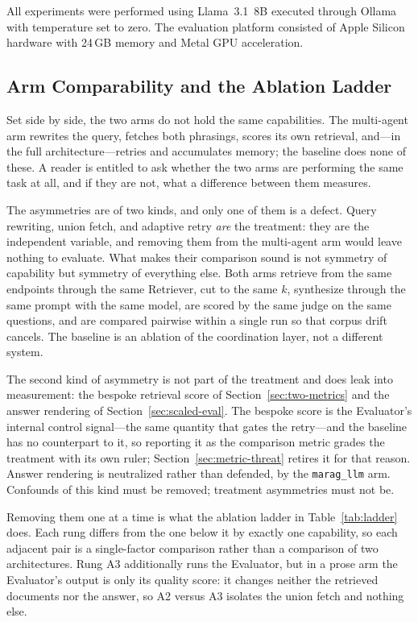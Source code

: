 \documentclass[acmsmall,review,anonymous,screen]{acmart}
\begin{document}
All experiments were performed using Llama~3.1~8B executed through
Ollama with temperature set to zero. The evaluation platform consisted
of Apple Silicon hardware with 24\,GB memory and Metal GPU
acceleration.

\subsection{Arm Comparability and the Ablation Ladder}\label{sec:ladder}

Set side by side, the two arms do not hold the same capabilities. The
multi-agent arm rewrites the query, fetches both phrasings, scores its own
retrieval, and---in the full architecture---retries and accumulates memory; the
baseline does none of these. A reader is entitled to ask whether the two arms
are performing the same task at all, and if they are not, what a difference
between them measures.

The asymmetries are of two kinds, and only one of them is a defect. Query
rewriting, union fetch, and adaptive retry \emph{are} the treatment: they are
the independent variable, and removing them from the multi-agent arm would
leave nothing to evaluate. What makes their comparison sound is not symmetry of
capability but symmetry of everything else. Both arms retrieve from the same
endpoints through the same Retriever, cut to the same $k$, synthesize through
the same prompt with the same model, are scored by the same judge on the same
questions, and are compared pairwise within a single run so that corpus drift
cancels. The baseline is an ablation of the coordination layer, not a different
system.

The second kind of asymmetry is not part of the treatment and does leak into
measurement: the bespoke retrieval score of Section~\ref{sec:two-metrics} and
the answer rendering of Section~\ref{sec:scaled-eval}. The bespoke score is the
Evaluator's internal control signal---the same quantity that gates the
retry---and the baseline has no counterpart to it, so reporting it as the
comparison metric grades the treatment with its own ruler; Section~\ref{sec:metric-threat}
retires it for that reason. Answer rendering is neutralized rather than
defended, by the \texttt{marag\_llm} arm. Confounds of this kind must be
removed; treatment asymmetries must not be.

Removing them one at a time is what the ablation ladder in
Table~\ref{tab:ladder} does. Each rung differs from the one below it by exactly
one capability, so each adjacent pair is a single-factor comparison rather than
a comparison of two architectures. Rung A3 additionally runs the Evaluator, but
in a prose arm the Evaluator's output is only its quality score: it changes
neither the retrieved documents nor the answer, so A2 versus A3 isolates the
union fetch and nothing else.
\end{document}
